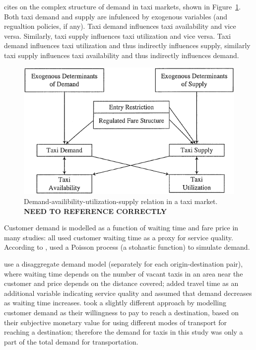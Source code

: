 \textcite{Yang2002taxi+demand} cites \textcite{Manski1967taxi+demand} on the
complex structure of demand in taxi markets, shown in Figure~\ref{figure:taxi}.
Both taxi demand and supply are infulenced by exogenous variables (and
regualtion policies, if any). Taxi demand influences taxi availability and vice
versa. Similarly, taxi supply influences taxi utilization and vice versa. Taxi
demand influences taxi utilization and thus indirectly influences supply,
similarly taxi supply influences taxi availability and thus indirectly
influences demand.

\begin{figure}
  \begin{center}
    \includegraphics{../figures/taxi_demand}
    \caption{
      Demand-availibility-utilization-supply relation in a taxi market. 
      \textbf{NEED TO REFERENCE CORRECTLY}
      \label{figure:taxi}
    }
  \end{center}
\end{figure}

Customer demand is modelled as a function of waiting time and fare price in
many studies: \textcite{Douglas1972taxi+regulation, Devany1975taxi+capacity,
Cairns1996taxi+competition, Yang2002taxi+demand} all used customer waiting time
as a proxy for service quality. According to
\textcite{Salanova2011taxi+review}, \textcite{Manski1967taxi+demand} used a
Poisson process (a stohastic function) to simulate demand.

\textcite{Yang2002taxi+demand} use a disaggregate demand model (separately for
each origin-destination pair), where waiting time depends on the number of
vacant taxis in an area near the customer and price depends on the distance
covered; \textcite{Yang2010taxi+nonlinear} added travel time as an additional
variable indicating service quality and assumed that demand decreases as
waiting time increases. \textcite{Yang2010taxi+equilibria} took a slightly
different approach by modelling customer demand as their willingness to pay to
reach a destination, based on their subjective monetary value for using
different modes of transport for reaching a destination; therefore the demand
for taxis in this study was only a part of the total demand for transportation.
